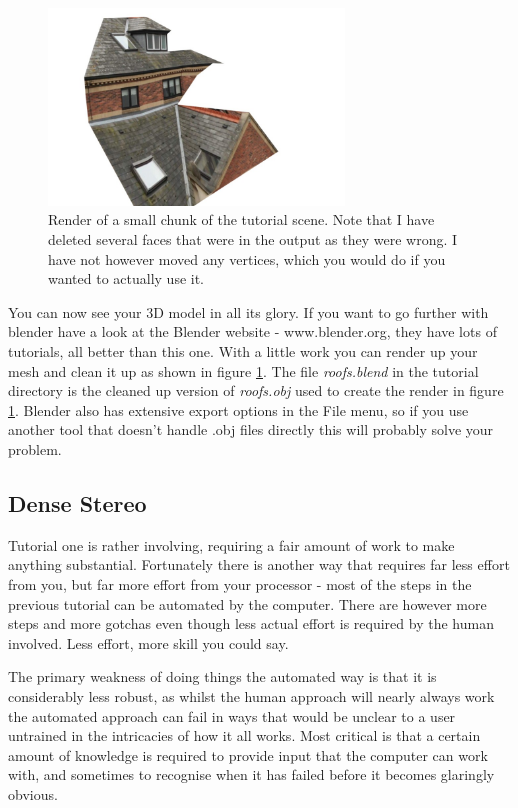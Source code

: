 \documentclass[10pt,a4paper,twoside]{article}
\begin{document}
\begin{figure}
 \centering
 \includegraphics[width=0.7\textwidth]{screenshots/sparse_render}
 \caption{Render of a small chunk of the tutorial scene. Note that I have deleted several faces that were in the output as they were wrong. I have not however moved any vertices, which you would do if you wanted to actually use it.}
 \label{fig:sparse_render}
\end{figure}

You can now see your 3D model in all its glory. If you want to go further with blender have a look at the Blender website - www.blender.org, they have lots of tutorials, all better than this one. With a little work you can render up your mesh and clean it up as shown in figure \ref{fig:sparse_render}. The file \emph{roofs.blend} in the tutorial directory is the cleaned up version of \emph{roofs.obj} used to create the render in figure \ref{fig:sparse_render}. Blender also has extensive export options in the File menu, so if you use another tool that doesn't handle .obj files directly this will probably solve your problem.


\subsection {Dense Stereo}
Tutorial one is rather involving, requiring a fair amount of work to make anything substantial. Fortunately there is another way that requires far less effort from you, but far more effort from your processor - most of the steps in the previous tutorial can be automated by the computer. There are however more steps and more gotchas even though less actual effort is required by the human involved. Less effort, more skill you could say. 

The primary weakness of doing things the automated way is that it is considerably less robust, as whilst the human approach will nearly always work the automated approach can fail in ways that would be unclear to a user untrained in the intricacies of how it all works. Most critical is that a certain amount of knowledge is required to provide input that the computer can work with, and sometimes to recognise when it has failed before it becomes glaringly obvious.
\end{document}
